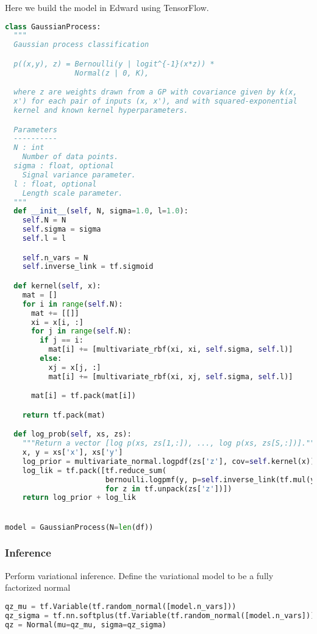 Here we build the model in Edward using TensorFlow.
\begin{lstlisting}[language=Python]
class GaussianProcess:
  """
  Gaussian process classification

  p((x,y), z) = Bernoulli(y | logit^{-1}(x*z)) *
                Normal(z | 0, K),

  where z are weights drawn from a GP with covariance given by k(x,
  x') for each pair of inputs (x, x'), and with squared-exponential
  kernel and known kernel hyperparameters.

  Parameters
  ----------
  N : int
    Number of data points.
  sigma : float, optional
    Signal variance parameter.
  l : float, optional
    Length scale parameter.
  """
  def __init__(self, N, sigma=1.0, l=1.0):
    self.N = N
    self.sigma = sigma
    self.l = l

    self.n_vars = N
    self.inverse_link = tf.sigmoid

  def kernel(self, x):
    mat = []
    for i in range(self.N):
      mat += [[]]
      xi = x[i, :]
      for j in range(self.N):
        if j == i:
          mat[i] += [multivariate_rbf(xi, xi, self.sigma, self.l)]
        else:
          xj = x[j, :]
          mat[i] += [multivariate_rbf(xi, xj, self.sigma, self.l)]

      mat[i] = tf.pack(mat[i])

    return tf.pack(mat)

  def log_prob(self, xs, zs):
    """Return a vector [log p(xs, zs[1,:]), ..., log p(xs, zs[S,:])]."""
    x, y = xs['x'], xs['y']
    log_prior = multivariate_normal.logpdf(zs['z'], cov=self.kernel(x))
    log_lik = tf.pack([tf.reduce_sum(
                       bernoulli.logpmf(y, p=self.inverse_link(tf.mul(y, z))))
                       for z in tf.unpack(zs['z'])])
    return log_prior + log_lik


model = GaussianProcess(N=len(df))
\end{lstlisting}


\subsubsection{Inference}

Perform variational inference.
Define the variational model to be a fully factorized normal
\begin{lstlisting}[language=Python]
qz_mu = tf.Variable(tf.random_normal([model.n_vars]))
qz_sigma = tf.nn.softplus(tf.Variable(tf.random_normal([model.n_vars])))
qz = Normal(mu=qz_mu, sigma=qz_sigma)
\end{lstlisting}

